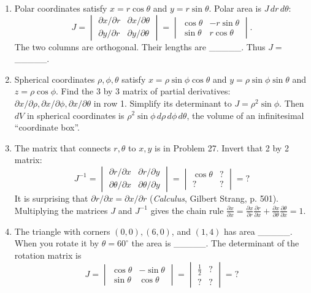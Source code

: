 \documentclass[14pt, a4paper]{article}
\begin{document}
\begin{enumerate}[resume]
    \item Polar coordinates satisfy $x = r \cos \theta$ and $y = r \sin \theta$. Polar area is $J \, dr \, d\theta$:
          \[
              J = \begin{vmatrix} \partial x / \partial r & \partial x / \partial \theta \\ \partial y / \partial r & \partial y / \partial \theta \end{vmatrix} =
              \begin{vmatrix} \cos \theta & -r \sin \theta \\ \sin \theta & r \cos \theta \end{vmatrix} .
          \]
          The two columns are orthogonal. Their lengths are \_\_\_\_\_. Thus $J = $ \_\_\_\_\_.

    \item Spherical coordinates $\rho, \phi, \theta$ satisfy $x = \rho \sin \phi \cos \theta$ and $y = \rho \sin \phi \sin \theta$ and $z = \rho \cos \phi$. Find the 3 by 3 matrix of partial derivatives: $\partial x/\partial \rho, \partial x/\partial \phi, \partial x/\partial \theta$ in row 1. Simplify its determinant to $J = \rho^2 \sin \phi$. Then $dV$ in spherical coordinates is $\rho^2 \sin \phi \, d\rho \, d\phi \, d\theta$, the volume of an infinitesimal ``coordinate box''.

    \item The matrix that connects $r, \theta$ to $x, y$ is in Problem 27. Invert that 2 by 2 matrix:
          \[
              J^{-1} = \begin{vmatrix} \partial r/\partial x & \partial r/\partial y \\ \partial \theta/\partial x & \partial \theta/\partial y \end{vmatrix} =
              \begin{vmatrix} \cos \theta & ? \\ ? & ? \end{vmatrix} = ?
          \]
          It is surprising that $\partial r/\partial x = \partial x/\partial r$ (\textit{Calculus}, Gilbert Strang, p. 501). Multiplying the matrices $J$ and $J^{-1}$ gives the chain rule $\frac{\partial x}{\partial x} = \frac{\partial x}{\partial r}\frac{\partial r}{\partial x} + \frac{\partial x}{\partial \theta}\frac{\partial \theta}{\partial x} = 1$.

    \item The triangle with corners $(0, 0), (6, 0)$, and $(1, 4)$ has area \_\_\_\_\_. When you rotate it by $\theta = 60^\circ$ the area is \_\_\_\_\_. The determinant of the rotation matrix is
          \[
              J = \begin{vmatrix} \cos \theta & -\sin \theta \\ \sin \theta & \cos \theta \end{vmatrix} =
              \begin{vmatrix} \frac{1}{2} & ? \\ ? & ? \end{vmatrix} = ?
          \]
\end{enumerate}
\end{document}
